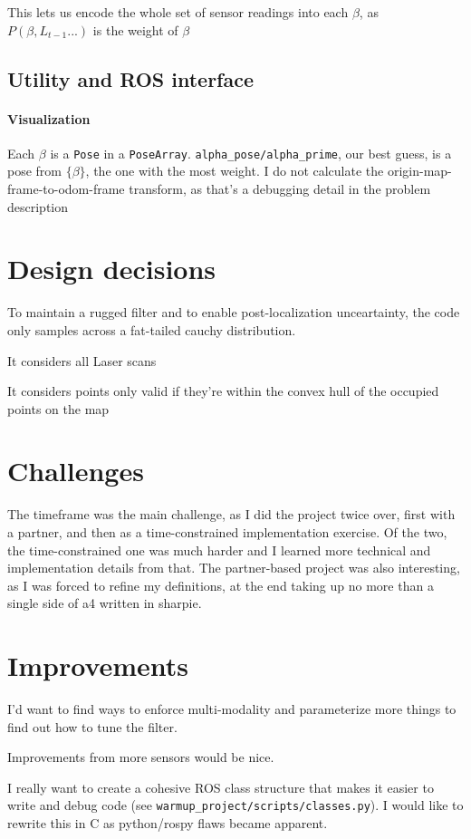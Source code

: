 \documentclass[]{article}
\begin{document}
This lets us encode the whole set of sensor readings into each $\beta$, as $P(\beta, L_{t-1}...)$ is the weight of $\beta$

\subsection{Utility and ROS interface}
\paragraph{Visualization} Each $\beta$ is a \verb|Pose| in a \verb|PoseArray|. \verb|alpha_pose/alpha_prime|, our best guess, is a pose from $\{\beta\}$, the one with the most weight. I do not calculate the origin-map-frame-to-odom-frame transform, as that's a debugging detail in the problem description
\section{Design decisions}
To maintain a rugged filter and to enable post-localization unceartainty, the code only samples across a fat-tailed cauchy distribution.

It considers all Laser scans

It considers points only valid if they're within the convex hull of the occupied points on the map
\section{Challenges}
The timeframe was the main challenge, as I did the project twice over, first with a partner, and then as a time-constrained implementation exercise. Of the two, the time-constrained one was much harder and I learned more technical and implementation details from that. The partner-based project was also interesting, as I was forced to refine my definitions, at the end taking up no more than a single side of a4 written in sharpie.
\section{Improvements}
I'd want to find ways to enforce multi-modality and parameterize more things to find out how to tune the filter.

Improvements from more sensors would be nice.

I really want to create a cohesive ROS class structure that makes it easier to write and debug code (see \verb|warmup_project/scripts/classes.py|). I would like to rewrite this in C as python/rospy flaws became apparent.
\end{document}
